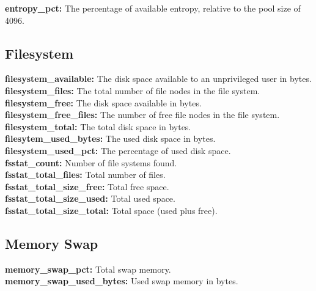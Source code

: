 \documentclass{iosart2c}
\begin{document}
\textbf{entropy\_pct:} The percentage of available entropy, relative to the pool size of 4096.\\



\subsection{Filesystem}

\textbf{filesystem\_available:} The disk space available to an unprivileged user in bytes.\\

\textbf{filesystem\_files:} The total number of file nodes in the file system.\\

\textbf{filesystem\_free:} The disk space available in bytes.\\

\textbf{filesystem\_free\_files:} The number of free file nodes in the file system.\\

\textbf{filesystem\_total:} The total disk space in bytes.\\

\textbf{filesytem\_used\_bytes:} The used disk space in bytes.\\

\textbf{filesystem\_used\_pct:} The percentage of used disk space.\\

\textbf{fsstat\_count:} Number of file systems found.\\

\textbf{fsstat\_total\_files:} Total number of files.\\

\textbf{fsstat\_total\_size\_free:} Total free space.\\

\textbf{fsstat\_total\_size\_used:} Total used space.\\

\textbf{fsstat\_total\_size\_total:} Total space (used plus free).\\

\subsection{Memory Swap}

\textbf{memory\_swap\_pct:} Total swap memory.\\

\textbf{memory\_swap\_used\_bytes:} Used swap memory in bytes.\\
\end{document}
